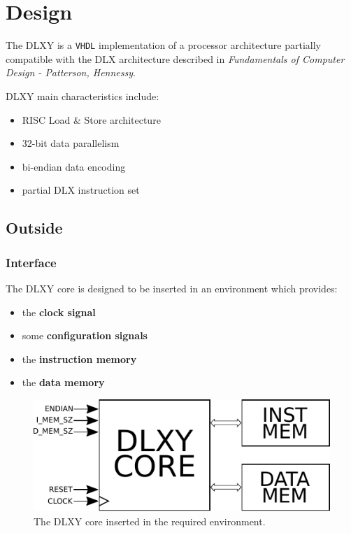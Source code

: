 \chapter{Design}
\label{chap1}

The DLXY is a \texttt{VHDL} implementation of a processor architecture partially
compatible with the DLX architecture described in \textit{Fundamentals of
Computer Design - Patterson, Hennessy}.

\bigskip
DLXY main characteristics include:
\begin{itemize}
	\item RISC Load \& Store architecture
	\item 32-bit data parallelism
	\item bi-endian data encoding
	\item partial DLX instruction set
\end{itemize}

\section{Outside}

\subsection{Interface}
The DLXY core is designed to be inserted in an environment which provides:
\begin{itemize}
	\item the \textbf{clock signal}
	\item some \textbf{configuration signals}
	\item the \textbf{instruction memory}
	\item the \textbf{data memory}
\end{itemize}

\begin{figure}[ht]
	\centering
	\includegraphics[width=.5\textwidth]{chapters/figures/top_mounted} 
	\caption{The DLXY core inserted in the required environment.}
	\label{fig:env_top}
\end{figure}

